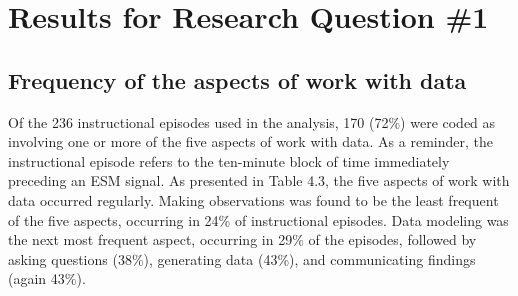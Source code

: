 \documentclass[]{msu-thesis}
\theoremstyle{definition}
\theoremstyle{definition}
\theoremstyle{definition}
\theoremstyle{remark}
\begin{document}
\begin{table}

\caption{\label{tab:unnamed-chunk-8}Correlations among the continuous study variables}
\centering
{}
\end{table}

\section{Results for Research Question
\#1}\label{results-for-research-question-1}

\subsection{Frequency of the aspects of work with
data}\label{frequency-of-the-aspects-of-work-with-data}

Of the 236 instructional episodes used in the analysis, 170 (72\%) were
coded as involving one or more of the five aspects of work with data. As
a reminder, the instructional episode refers to the ten-minute block of
time immediately preceding an ESM signal. As presented in Table 4.3, the
five aspects of work with data occurred regularly. Making observations
was found to be the least frequent of the five aspects, occurring in
24\% of instructional episodes. Data modeling was the next most frequent
aspect, occurring in 29\% of the episodes, followed by asking questions
(38\%), generating data (43\%), and communicating findings (again 43\%).
\end{document}
